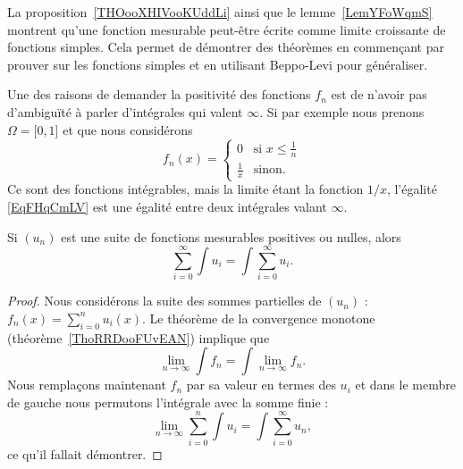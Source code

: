 \begin{remark}
	La proposition~\ref{THOooXHIVooKUddLi} ainsi que le lemme~\ref{LemYFoWqmS} montrent qu'une fonction mesurable peut-être écrite comme limite croissante de fonctions simples. Cela permet de démontrer des théorèmes en commençant par prouver sur les fonctions simples et en utilisant Beppo-Levi pour généraliser.
\end{remark}

\begin{remark}
	Une des raisons de demander la positivité des fonctions \( f_n\) est de n'avoir pas d'ambiguïté à parler d'intégrales qui valent \( \infty\). Si par exemple nous prenons \( \Omega=\mathopen[ 0 , 1 \mathclose]\) et que nous considérons
	\begin{equation}
		f_n(x)=\begin{cases}
			0             & \text{si } x\leq \frac{1}{ n } \\
			\frac{1}{ x } & \text{sinon}.
		\end{cases}
	\end{equation}
	Ce sont des fonctions intégrables, mais la limite étant la fonction \( 1/x\), l'égalité \eqref{EqFHqCmLV} est une égalité entre deux intégrales valant \( \infty\).
\end{remark}

\begin{corollary} \label{CorNKXwhdz}
	Si \( (u_n)\) est une suite de fonctions mesurables positives ou nulles, alors
	\begin{equation}
		\sum_{i=0}^{\infty}\int u_i=\int\sum_{i=0}^{\infty}u_i.
	\end{equation}
\end{corollary}

\begin{proof}
	Nous considérons la suite des sommes partielles de \( (u_n)\) : \( f_n(x)=\sum_{i=0}^nu_i(x)\). Le théorème de la convergence monotone (théorème~\ref{ThoRRDooFUvEAN}) implique que
	\begin{equation}
		\lim_{n\to \infty} \int f_n=\int\lim_{n\to \infty} f_n.
	\end{equation}
	Nous remplaçons maintenant \( f_n\) par sa valeur en termes des \( u_i\) et dans le membre de gauche nous permutons l'intégrale avec la somme finie :
	\begin{equation}
		\lim_{n\to \infty} \sum_{i=0}^{n}\int u_i=\int\sum_{i=0}^{\infty}u_n,
	\end{equation}
	ce qu'il fallait démontrer.
\end{proof}

